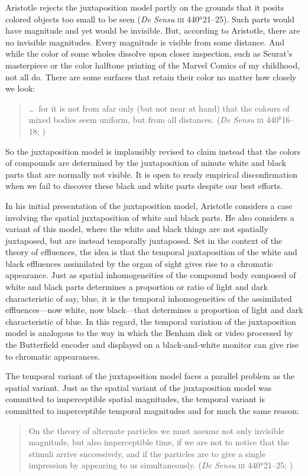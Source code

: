 Aristotle rejects the juxtaposition model partly on the grounds that it posits colored objects too small to be seen (\emph{De Sensu} \textsc{iii} 440\( ^{a} \)21--25). Such parts would have magnitude and yet would be invisible. But, according to Aristotle, there are no invisible magnitudes. Every magnitude is visible from some distance. And while the color of some wholes dissolve upon closer inspection, such as Seurat's masterpiece or the color halftone printing of the Marvel Comics of my childhood, not all do. There are some surfaces that retain their color no matter how closely we look: 
\begin{quote}
	\ldots\ for it is not from afar only (but not near at hand) that the colours of mixed bodies seem uniform, but from all distances. (\emph{De Sensu} \textsc{iii} 440\( ^{b} \)16--18; \citealt[237]{Hett:1936fk})
\end{quote}
So the juxtaposition model is implausibly revised to claim instead that the colors of compounds are determined by the juxtaposition of minute white and black parts that are normally not visible. It is open to ready empirical disconfirmation when we fail to discover these black and white parts despite our best efforts.

In his initial presentation of the juxtaposition model, Aristotle considers a case involving the spatial juxtaposition of white and black parts. He also considers a variant of this model, where the white and black things are not spatially juxtaposed, but are instead temporally juxtaposed. Set in the context of the theory of effluences, the idea is that the temporal juxtaposition of the white and black effluences assimilated by the organ of sight gives rise to a chromatic appearance. Just as spatial inhomogeneities of the compound body composed of white and black parts determines a proportion or ratio of light and dark characteristic of say, blue, it is the temporal inhomogeneities of the assimilated effluences---now white, now black---that determines a proportion of light and dark characteristic of blue. In this regard, the temporal variation of the juxtaposition model is analogous to the way in which the Benham disk or video processed by the Butterfield encoder and displayed on a black-and-white monitor can give rise to chromatic appearances.

The temporal variant of the juxtaposition model faces a parallel problem as the spatial variant. Just as the spatial variant of the juxtaposition model was committed to imperceptible spatial magnitudes, the temporal variant is committed to imperceptible temporal magnitudes and for much the same reason:
\begin{quote}
	On the theory of alternate particles we must assume not only invisible magnitude, but also imperceptible time, if we are not to notice that the stimuli arrive successively, and if the particles are to give a single impression by appearing to us simultaneously. (\emph{De Sensu} \textsc{iii} 440\( ^{a} \)21--25; \citealt[235]{Hett:1936fk})
\end{quote}

